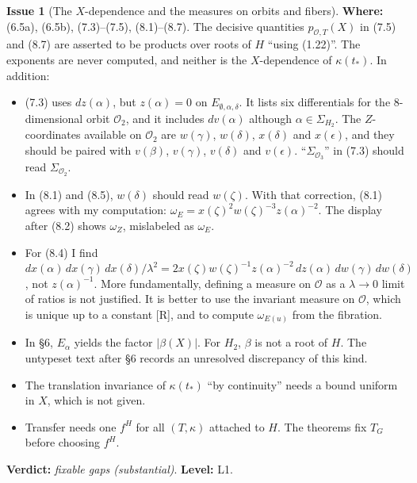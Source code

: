 \documentclass[12pt,letterpaper]{article}
\newcommand{\cO}{\mathcal{O}}
\newcommand{\Lv}[1]{\textsf{L#1}}
\newcommand{\verdict}[1]{\textbf{Verdict:} \emph{#1}.}
\newcommand{\level}[1]{\textbf{Level:} #1.}
\newcommand{\loc}[1]{\textbf{Where:} #1.}
\theoremstyle{definition}
\newtheorem{issue}{Issue}[section]
\begin{document}
\begin{issue}[The $X$-dependence and the measures on orbits and fibers]\label{iss:pX}
\loc{(6.5a), (6.5b), (7.3)--(7.5), (8.1)--(8.7)}
The decisive quantities $p_{\cO,T}(X)$ in (7.5) and (8.7) are asserted to be
products over roots of $H$ ``using (1.22)''. The exponents are never computed,
and neither is the $X$-dependence of $\kappa(t_*)$. In addition:
\begin{itemize}
\item (7.3) uses $dz(\alpha)$, but $z(\alpha)=0$ on $E_{\emptyset,\alpha,\delta}$.
It lists six differentials for the $8$-dimensional orbit $\cO_2$, and it
includes $dv(\alpha)$ although $\alpha\in\Sigma_{H_2}$. The $Z$-coordinates
available on $\cO_2$ are $w(\gamma)$, $w(\delta)$, $x(\delta)$ and
$x(\epsilon)$, and they should be paired with $v(\beta)$, $v(\gamma)$,
$v(\delta)$ and $v(\epsilon)$. ``$\Sigma_{\cO_3}$'' in (7.3) should read
$\Sigma_{\cO_2}$.
\item In (8.1) and (8.5), $w(\delta)$ should read $w(\zeta)$. With that
correction, (8.1) agrees with my computation:
$\omega_E=x(\zeta)^2w(\zeta)^{-3}z(\alpha)^{-2}$. The display after (8.2)
shows $\omega_{Z}$, mislabeled as $\omega_E$.
\item For (8.4) I find
$dx(\alpha)\,dx(\gamma)\,dx(\delta)/\lambda^2=2x(\zeta)w(\zeta)^{-1}z(\alpha)^{-2}\,dz(\alpha)\,dw(\gamma)\,dw(\delta)$,
not $z(\alpha)^{-1}$. More fundamentally, defining a measure on $\cO$ as a
$\lambda\to0$ limit of ratios is not justified. It is better to use the
invariant measure on $\cO$, which is unique up to a constant [R], and to
compute $\omega_{E(u)}$ from the fibration.
\item In \S6, $E_\alpha$ yields the factor $|\beta(X)|$. For $H_2$, $\beta$ is
not a root of $H$. The untypeset text after \S6 records an unresolved
discrepancy of this kind.
\item The translation invariance of $\kappa(t_*)$ ``by continuity'' needs a
bound uniform in $X$, which is not given.
\item Transfer needs one $f^H$ for all $(T,\kappa)$ attached to $H$. The
theorems fix $T_G$ before choosing $f^H$.
\end{itemize}

\verdict{fixable gaps (substantial)}
\level{\Lv{1}}
\end{issue}
\end{document}

